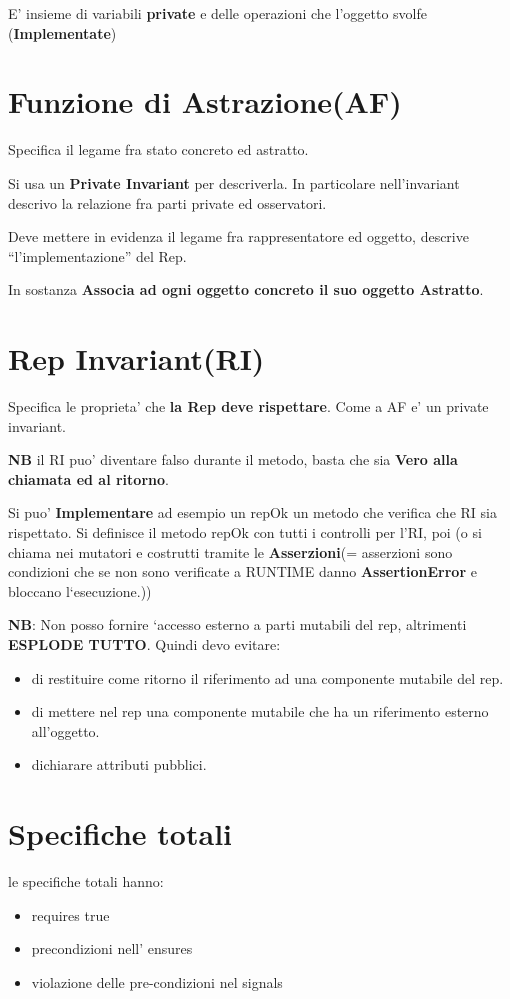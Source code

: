 \documentclass[\main/main.tex]{subfiles}
\begin{document}
E' insieme di variabili \textbf{private} e delle operazioni che l'oggetto svolfe (\textbf{Implementate})

\section{Funzione di Astrazione(AF)}
Specifica il legame fra stato concreto ed astratto.

Si usa un \textbf{Private Invariant} per descriverla. In particolare nell'invariant descrivo la relazione fra parti private ed osservatori.

Deve mettere in evidenza il legame fra rappresentatore ed oggetto, descrive ``l'implementazione'' del Rep.

In sostanza \textbf{Associa ad ogni oggetto concreto il suo oggetto Astratto}.

\section{Rep Invariant(RI)}
Specifica le proprieta' che \textbf{la Rep deve rispettare}.
Come a AF e' un private invariant.

\textbf{NB} il RI puo' diventare falso durante il metodo, basta che sia \textbf{Vero alla chiamata ed al ritorno}.

Si puo' \textbf{Implementare} ad esempio un repOk un metodo che verifica che RI sia rispettato.  Si definisce il metodo repOk con tutti i controlli per l'RI, poi (o si chiama nei mutatori e costrutti tramite le \textbf{Asserzioni}(= asserzioni sono condizioni che se non sono verificate a RUNTIME danno \textbf{AssertionError} e bloccano l`esecuzione.))

\textbf{NB}: Non posso fornire `accesso esterno a parti mutabili del rep, altrimenti \textbf{ESPLODE TUTTO}.
Quindi devo evitare:
\begin{itemize}
\item di restituire come ritorno il riferimento ad una componente mutabile del rep.
\item di mettere nel rep una componente mutabile che ha un riferimento esterno all'oggetto.
\item dichiarare attributi pubblici.
\end{itemize}

\section{Specifiche totali}
le specifiche totali hanno:
\begin{itemize}
\item requires true
\item precondizioni nell' ensures
\item violazione delle pre-condizioni nel signals
\end{itemize}
\end{document}
